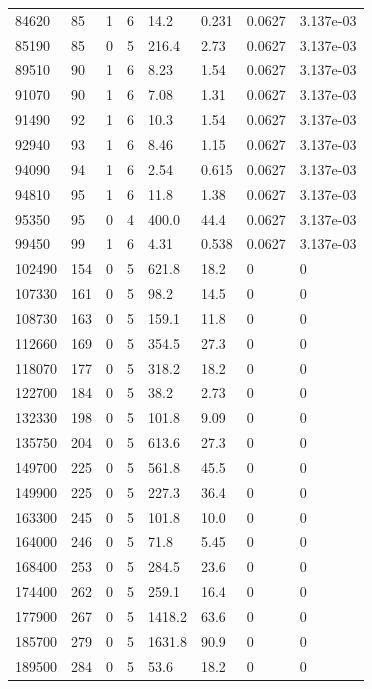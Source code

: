 \documentclass[preview]{standalone}
\begin{document}
{{{\begin{tabular}{L{1.2cm}C{1.2cm} C{0.3cm}C{0.5cm} C{1.4cm}C{1.4cm} C{1.4cm}C{1.4cm}}
  84620  &    85  & 1     &  6 &  14.2  & 0.231  & 0.0627 &  3.137e-03   \\ 
  85190  &    85  & 0     &  5 &  216.4  & 2.73  & 0.0627 &  3.137e-03   \\ 
  89510  &    90  & 1     &  6 &  8.23  & 1.54  & 0.0627 &  3.137e-03   \\ 
  91070  &    90  & 1     &  6 &  7.08  & 1.31  & 0.0627 &  3.137e-03   \\ 
  91490  &    92  & 1     &  6 &  10.3  & 1.54  & 0.0627 &  3.137e-03   \\ 
  92940  &    93  & 1     &  6 &  8.46  & 1.15  & 0.0627 &  3.137e-03   \\ 
  94090  &    94  & 1     &  6 &  2.54  & 0.615  & 0.0627 &  3.137e-03   \\ 
  94810  &    95  & 1     &  6 &  11.8  & 1.38  & 0.0627 &  3.137e-03   \\ 
  95350  &    95  & 0     &  4 &  400.0  & 44.4  & 0.0627 &  3.137e-03   \\ 
  99450  &    99  & 1     &  6 &  4.31  & 0.538  & 0.0627 &  3.137e-03   \\ 
  102490  &   154  & 0     &  5 &  621.8  & 18.2  & 0 &  0   \\ 
  107330  &   161  & 0     &  5 &  98.2  & 14.5  & 0 &  0   \\ 
  108730  &   163  & 0     &  5 &  159.1  & 11.8  & 0 &  0   \\ 
  112660  &   169  & 0     &  5 &  354.5  & 27.3  & 0 &  0   \\ 
  118070  &   177  & 0     &  5 &  318.2  & 18.2  & 0 &  0   \\ 
  122700  &   184  & 0     &  5 &  38.2  & 2.73  & 0 &  0   \\ 
  132330  &   198  & 0     &  5 &  101.8  & 9.09  & 0 &  0   \\ 
  135750  &   204  & 0     &  5 &  613.6  & 27.3  & 0 &  0   \\ 
  149700  &   225  & 0     &  5 &  561.8  & 45.5  & 0 &  0   \\ 
  149900  &   225  & 0     &  5 &  227.3  & 36.4  & 0 &  0   \\ 
  163300  &   245  & 0     &  5 &  101.8  & 10.0  & 0 &  0   \\ 
  164000  &   246  & 0     &  5 &  71.8  & 5.45  & 0 &  0   \\ 
  168400  &   253  & 0     &  5 &  284.5  & 23.6  & 0 &  0   \\ 
  174400  &   262  & 0     &  5 &  259.1  & 16.4  & 0 &  0   \\ 
  177900  &   267  & 0     &  5 &  1418.2  & 63.6  & 0 &  0   \\ 
  185700  &   279  & 0     &  5 &  1631.8  & 90.9  & 0 &  0   \\ 
  189500  &   284  & 0     &  5 &  53.6  & 18.2  & 0 &  0   \\ 
\hline 
\end{tabular} 

}}}
\end{document}
